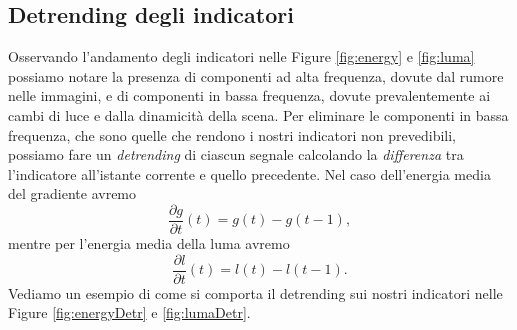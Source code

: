 \subsection{Detrending degli indicatori}
Osservando l'andamento degli indicatori nelle Figure \ref{fig:energy} e \ref{fig:luma} possiamo notare la presenza di componenti ad alta frequenza, dovute dal rumore nelle immagini, e di componenti in bassa frequenza, dovute prevalentemente ai cambi di luce e dalla dinamicit\`a della scena.
Per eliminare le componenti in bassa frequenza, che sono quelle che rendono i nostri indicatori non prevedibili, possiamo fare un \textit{detrending} di ciascun segnale calcolando la \textit{differenza} tra l'indicatore all'istante corrente e quello precedente.
Nel caso dell'energia media del gradiente avremo
\begin{equation}
\label{eq:gradientDetr}
\frac{\partial g}{\partial t}(t) = g(t) - g(t-1),
\end{equation}
mentre per l'energia media della luma avremo
\begin{equation}
\label{eq:lumaDetr}
\frac{\partial l}{\partial t}(t) = l(t) - l(t-1).
\end{equation}
Vediamo un esempio di come si comporta il detrending sui nostri indicatori nelle Figure \ref{fig:energyDetr} e \ref{fig:lumaDetr}.  
